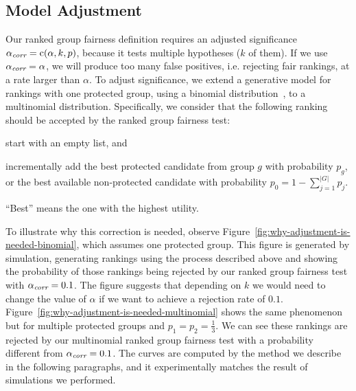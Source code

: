 \FloatBarrier
\subsection{Model Adjustment}
\label{subsec:group-fairness-correction}

Our ranked group fairness definition requires an adjusted significance $\alpha_\textit{corr} = \operatorname{c}(\alpha, k, p)$, because it tests multiple hypotheses ($k$ of them).
%
If we use $\alpha_\textit{corr} = \alpha$, we will produce too many false positives, i.e. rejecting fair rankings, at a rate larger than $\alpha$.
%
To adjust significance, we extend a generative model for rankings with one protected group, using a binomial distribution~\cite{yang2016measuring}, to a multinomial distribution.
%
Specifically, we consider that the following ranking should be accepted by the ranked group fairness test: \begin{inparaenum}[(i)]
	\item start with an empty list, and
	\item incrementally add the best protected candidate from group $g$ with probability $p_g$, or the best available non-protected candidate with probability $p_0 = 1-\sum_{j=1}^{|G|} p_j$.
\end{inparaenum}
%
``Best'' means the one with the highest utility.

To illustrate why this correction is needed, observe Figure~\ref{fig:why-adjustment-is-needed-binomial}, which assumes one protected group.
%
This figure is generated by simulation, generating rankings using the process described above and showing the probability of those rankings being rejected by our ranked group fairness test with $\alpha_\textit{corr}=0.1$.
%
The figure suggests that depending on $k$ we would need to change the value of $\alpha$ if we want to achieve a rejection rate of $0.1$.
%
Figure~\ref{fig:why-adjustment-is-needed-multinomial} shows the same phenomenon but for multiple protected groups and $p_1=p_2=\frac{1}{3}$.
%
We can see these rankings are rejected by our multinomial ranked group fairness test with a probability different from $\alpha_\textit{corr}=0.1$.
%
The curves are computed by the method we describe in the following paragraphs, and it experimentally matches the result of simulations we performed.

